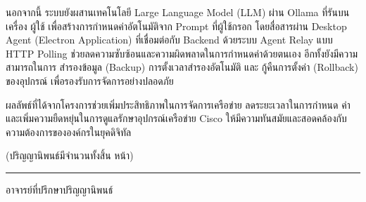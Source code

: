  \hspace*{1.3em} %
 นอกจากนี้ ระบบยังผสานเทคโนโลยี Large Language Model (LLM) ผ่าน Ollama ที่รันบนเครื่อง
 ผู้ใช้ เพื่อสร้างการกำหนดค่าอัตโนมัติจาก Prompt ที่ผู้ใช้กรอก โดยสื่อสารผ่าน Desktop Agent 
 (Electron Application) ที่เชื่อมต่อกับ Backend ด้วยระบบ Agent Relay แบบ HTTP Polling
 ช่วยลดความซับซ้อนและความผิดพลาดในการกำหนดค่าด้วยตนเอง อีกทั้งยังมีความสามารถในการ 
 สำรองข้อมูล (Backup) การตั้งเวลาสำรองอัตโนมัติ และ กู้คืนการตั้งค่า (Rollback) ของอุปกรณ์
 เพื่อรองรับการจัดการอย่างปลอดภัย

 \hspace*{1.3em} %
 ผลลัพธ์ที่ได้จากโครงการช่วยเพิ่มประสิทธิภาพในการจัดการเครือข่าย ลดระยะเวลาในการกำหนด
 ค่า และเพิ่มความยืดหยุ่นในการดูแลรักษาอุปกรณ์เครือข่าย Cisco ให้มีความทันสมัยและสอดคล้องกับ
 ความต้องการขององค์กรในยุคดิจิทัล

\begin{flushright}
(ปริญญานิพนธ์มีจำนวนทั้งสิ้น \pageref{LastPage} หน้า)

\vfill
\rule{10 cm}{0.4pt} อาจารย์ที่ปรึกษาปริญญานิพนธ์ 

\end{flushright}





\newpage
{}
{}

\vspace*{-0.5in}



